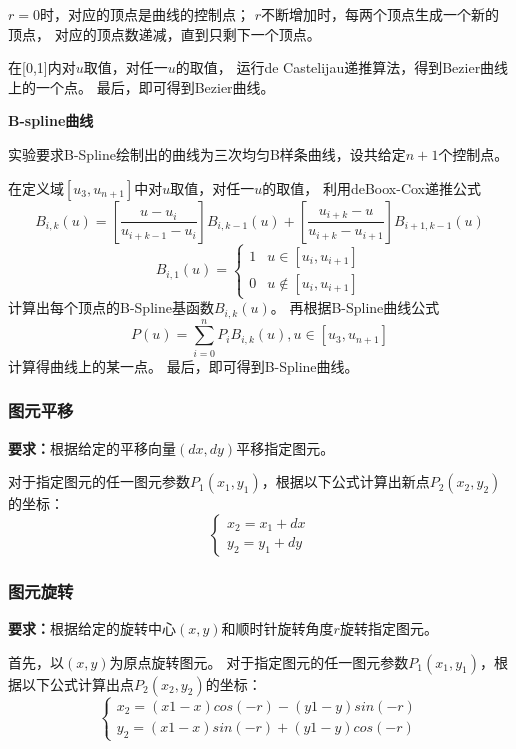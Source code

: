\documentclass[a4paper,UTF8]{article}
\begin{document}
$r=0$时，对应的顶点是曲线的控制点；
$r$不断增加时，每两个顶点生成一个新的顶点，
对应的顶点数递减，直到只剩下一个顶点。

在[0,1]内对$u$取值，对任一$u$的取值，
运行de Castelijau递推算法，得到Bezier曲线上的一个点。
最后，即可得到Bezier曲线。

\textbf{B-spline曲线}

实验要求B-Spline绘制出的曲线为三次均匀B样条曲线，设共给定$n+1$个控制点。

在定义域$[u_3,u_{n+1}]$中对$u$取值，对任一$u$的取值，
利用deBoox-Cox递推公式
\begin{equation*}
    B_{i,k}(u)
    =[\frac{u-u_i}{u_{i+k-1}-u_i}]B_{i,k-1}(u)
    +[\frac{u_{i+k}-u}{u_{i+k}-u_{i+1}}]B_{i+1,k-1}(u)
\end{equation*}
\begin{equation*}
    B_{i,1}(u)=
    \begin{cases}
    1 & u\in[u_i,u_{i+1}]\\
    0 & u\not\in[u_i,u_{i+1}]
    \end{cases}
\end{equation*}
计算出每个顶点的B-Spline基函数$B_{i,k}(u)$。
再根据B-Spline曲线公式
\begin{equation*}
    P(u)=\sum_{i=0}^nP_iB_{i,k}(u),u\in[u_3,u_{n+1}]
\end{equation*}
计算得曲线上的某一点。
最后，即可得到B-Spline曲线。


\subsubsection{图元平移}
\textbf{要求：}根据给定的平移向量$(dx,dy)$平移指定图元。

对于指定图元的任一图元参数$P_1(x_1,y_1)$，根据以下公式计算出新点$P_2(x_2,y_2)$的坐标：
\begin{equation*}
    \begin{cases}
        x_2=x_1+dx\\
        y_2=y_1+dy
    \end{cases}
\end{equation*}


\subsubsection{图元旋转}
\textbf{要求：}根据给定的旋转中心$(x,y)$和顺时针旋转角度$r$旋转指定图元。

首先，以$(x,y)$为原点旋转图元。
对于指定图元的任一图元参数$P_1(x_1,y_1)$，根据以下公式计算出点$P_2(x_2,y_2)$的坐标：
\begin{equation*}
    \begin{cases}
        x_2=(x1-x)cos(-r)-(y1-y)sin(-r)\\
        y_2=(x1-x)sin(-r)+(y1-y)cos(-r)
    \end{cases}
\end{equation*}
\end{document}
